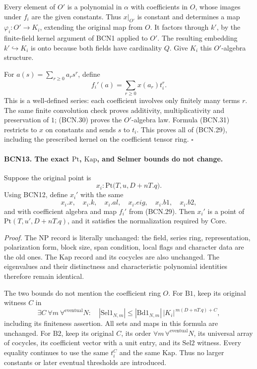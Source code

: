 Every element of \(O'\) is a polynomial in \(\alpha\) with
coefficients in \(O\), whose images under \(f_i\) are the
given constants.  Thus \(x|_{O'}\) is constant and determines
a map \(\varphi_i:O'\to K_i\), extending the original map
from \(O\).  It factors through \(k'\), by the finite-field
kernel argument of BCN1 applied to \(O'\).  The resulting
embedding \(k'\hookrightarrow K_i\) is onto because both
fields have cardinality \(Q\).  Give \(K_i\) this
\(O'\)-algebra structure.

For \(a(s)=\sum_{r\ge0}a_rs^r\), define
\[
 f_i'(a)=\sum_{r\ge0}x(a_r)t_i^r .                              \tag{BCN.31}
\]
This is a well-defined series: each coefficient involves
only finitely many terms \(r\).  The same finite convolution
check proves additivity, multiplicativity and preservation
of \(1\); (BCN.30) proves the \(O'\)-algebra law.
Formula (BCN.31) restricts to \(x\) on constants and sends
\(s\) to \(t_i\).  This proves all of (BCN.29), including
the prescribed kernel on the coefficient tensor ring.
\hfill\(\square\)

\paragraph{BCN13. The exact \(\mathrm{Pt}\), \(\mathrm{Kap}\),
and Selmer bounds do not change.}\label{claim:BCN13}
Suppose the original point is
\[
 x_i:\mathrm{Pt}\bigl(T,u,D+nT.q\bigr).
\]
Using BCN12, define \(x_i'\) with the same
\[
 x_i.x,\quad x_i.k,\quad x_i.al,\quad
 x_i.eig,\quad x_i.b1,\quad x_i.b2,
\]
and with coefficient algebra and map \(f_i'\) from (BCN.29).
Then \(x_i'\) is a point of
\(\mathrm{Pt}(T,u',D+nT.q)\), and it satisfies the
normalization required by \(\mathrm{Core}\).

\emph{Proof.}
The \(\mathrm{NP}\) record is literally unchanged: the field,
series ring, representation, polarization form, block size,
span condition, local flags and character data are the old ones.
The \(\mathrm{Kap}\) record and its cocycles are also unchanged.
The eigenvalues and their distinctness and characteristic
polynomial identities therefore remain identical.

The two bounds do not mention the coefficient ring \(O\).
For \(\mathrm{B1}\), keep its original witness \(C\) in
\[
 \exists C\ \forall m\ \forall^{\mathrm{eventual}}N:
 \quad
 |\mathrm{Sel1}_{N,m}|
 \le |\mathrm{Bd1}_{N,m}|\,|K_i|^{\,m(D+nT.q)+C},
                                                               \tag{BCN.32}
\]
including its finiteness assertion.  All sets and maps in
this formula are unchanged.
For \(\mathrm{B2}\), keep its original \(C\), its order
\(\forall m\,\forall^{\mathrm{eventual}}N\), its universal
array of cocycles, its coefficient vector with a unit
entry, and its \(\mathrm{Sel2}\) witness.  Every equality
continues to use the same \(t_i^C\) and the same
\(\mathrm{Kap}\).  Thus no larger constants or later
eventual thresholds are introduced.

